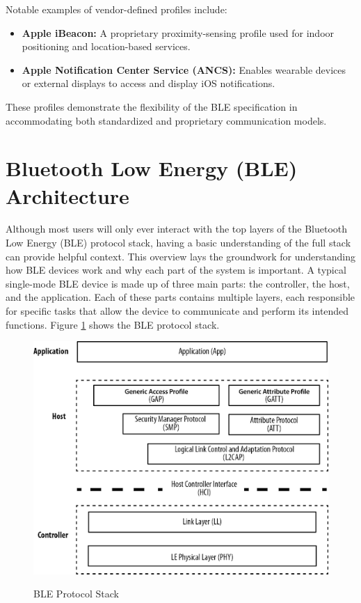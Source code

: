 Notable examples of vendor-defined profiles include:

\begin{itemize}
    \item \textbf{Apple iBeacon:} A proprietary proximity-sensing profile used for indoor positioning and location-based services.
    \item \textbf{Apple Notification Center Service (ANCS):} Enables wearable devices or external displays to access and display iOS notifications.
\end{itemize}

These profiles demonstrate the flexibility of the BLE specification in accommodating both standardized and proprietary communication models.

\section{Bluetooth Low Energy (BLE) Architecture}

Although most users will only ever interact with the top layers of the Bluetooth Low Energy (BLE) protocol stack, having a basic understanding of the full stack can provide helpful context. This overview lays the groundwork for understanding how BLE devices work and why each part of the system is important. A typical single-mode BLE device is made up of three main parts: the controller, the host, and the application. Each of these parts contains multiple layers, each responsible for specific tasks that allow the device to communicate and perform its intended functions. Figure \ref{fig:bleprotocolstack} shows the BLE protocol stack.

\begin{figure}[h]
    \caption{BLE Protocol Stack}
    \includegraphics[scale=.7]{bleprotocolstack.png}
    \label{fig:bleprotocolstack}
    \end{figure}

